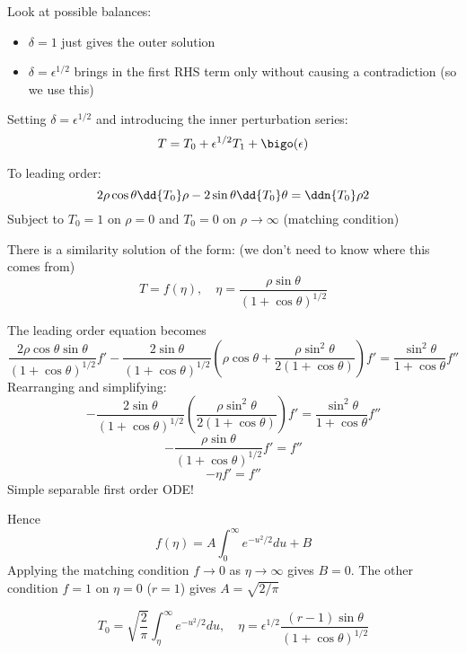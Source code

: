 \documentclass{/home/janmebows/Documents/LatexTemplates/myassignment}
\begin{document}
Look at possible balances:
\begin{itemize}
    \item $\delta =1$ just gives the outer solution
    \item $\delta= \epsilon^{1/2}$ brings in the first RHS term only without causing a contradiction (so we use this)
\end{itemize}


Setting $\delta=\epsilon^{1/2}$ and introducing the inner perturbation series:
\[T = T_0 + \epsilon^{1/2} T_1 + \bigo(\epsilon)\]

To leading order:
\[2\rho \cos\theta \dd{T_0}\rho - 2\sin\theta \dd{T_0}\theta = \ddn{T_0}\rho 2\]
Subject to $T_0 = 1$ on $\rho=0$ and $T_0=0$ on $\rho\to \infty$ (matching condition)

There is a similarity solution of the form: (we don't need to know where this comes from)
\[T = f(\eta) , \quad \eta = \frac{\rho\sin \theta}{(1+\cos\theta)^{1/2}}\]

The leading order equation becomes
\[\frac{2\rho\cos\theta\sin\theta}{(1+\cos\theta)^{1/2}} f' - \frac{2\sin\theta}{(1+\cos\theta)^{1/2}} \left(\rho \cos\theta + \frac{\rho\sin^2\theta}{2(1+\cos\theta)}\right) f' = \frac{\sin^2\theta}{1+\cos\theta} f''\]
Rearranging and simplifying:
\[- \frac{2\sin\theta}{(1+\cos\theta)^{1/2}} \left(\frac{\rho\sin^2\theta}{2(1+\cos\theta)}\right) f' = \frac{\sin^2\theta}{1+\cos\theta} f''\]
\[-\frac{\rho \sin\theta}{(1+\cos\theta)^{1/2}} f' = f''\]
\[-\eta f' = f''\]
Simple separable first order ODE!

Hence
\[f(\eta) = A\int_0^\infty e^{-u^2/2} du + B\]
Applying the matching condition $f\to 0$ as $\eta \to \infty$ gives $B=0$. The other condition $f=1$ on $\eta =0$ ($r=1$) gives $A = \sqrt{2/\pi}$

\[T_0 = \sqrt{\frac2\pi} \int_\eta^{\infty} e^{-u^2/2} du, \quad \eta = \epsilon^{1/2} \frac{(r-1)\sin\theta}{(1+\cos\theta)^{1/2}}\]


\end{document}
